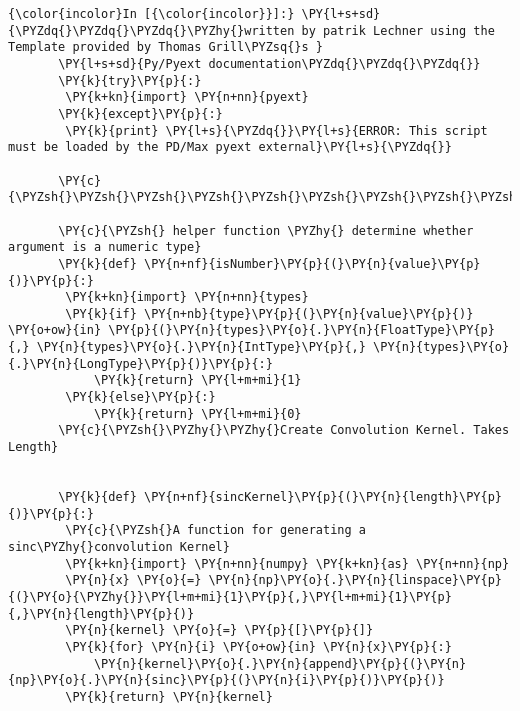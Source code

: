     
    \begin{Verbatim}[commandchars=\\\{\}]
{\color{incolor}In [{\color{incolor}}]:} \PY{l+s+sd}{\PYZdq{}\PYZdq{}\PYZdq{}\PYZhy{}written by patrik Lechner using the Template provided by Thomas Grill\PYZsq{}s }
       \PY{l+s+sd}{Py/Pyext documentation\PYZdq{}\PYZdq{}\PYZdq{}}
       \PY{k}{try}\PY{p}{:}
       	\PY{k+kn}{import} \PY{n+nn}{pyext}
       \PY{k}{except}\PY{p}{:}
       	\PY{k}{print} \PY{l+s}{\PYZdq{}}\PY{l+s}{ERROR: This script must be loaded by the PD/Max pyext external}\PY{l+s}{\PYZdq{}}
       
       \PY{c}{\PYZsh{}\PYZsh{}\PYZsh{}\PYZsh{}\PYZsh{}\PYZsh{}\PYZsh{}\PYZsh{}\PYZsh{}\PYZsh{}\PYZsh{}\PYZsh{}\PYZsh{}\PYZsh{}\PYZsh{}\PYZsh{}\PYZsh{}\PYZsh{}\PYZsh{}\PYZsh{}\PYZsh{}\PYZsh{}\PYZsh{}\PYZsh{}\PYZsh{}\PYZsh{}\PYZsh{}\PYZsh{}\PYZsh{}\PYZsh{}\PYZsh{}\PYZsh{}\PYZsh{}\PYZsh{}\PYZsh{}\PYZsh{}\PYZsh{}\PYZsh{}\PYZsh{}\PYZsh{}\PYZsh{}\PYZsh{}\PYZsh{}\PYZsh{}\PYZsh{}\PYZsh{}\PYZsh{}\PYZsh{}\PYZsh{}\PYZsh{}\PYZsh{}\PYZsh{}\PYZsh{}\PYZsh{}\PYZsh{}\PYZsh{}\PYZsh{}\PYZsh{}\PYZsh{}\PYZsh{}\PYZsh{}\PYZsh{}\PYZsh{}\PYZsh{}\PYZsh{}}
       
       \PY{c}{\PYZsh{} helper function \PYZhy{} determine whether argument is a numeric type}
       \PY{k}{def} \PY{n+nf}{isNumber}\PY{p}{(}\PY{n}{value}\PY{p}{)}\PY{p}{:}
       	\PY{k+kn}{import} \PY{n+nn}{types}
       	\PY{k}{if} \PY{n+nb}{type}\PY{p}{(}\PY{n}{value}\PY{p}{)} \PY{o+ow}{in} \PY{p}{(}\PY{n}{types}\PY{o}{.}\PY{n}{FloatType}\PY{p}{,} \PY{n}{types}\PY{o}{.}\PY{n}{IntType}\PY{p}{,} \PY{n}{types}\PY{o}{.}\PY{n}{LongType}\PY{p}{)}\PY{p}{:}
       		\PY{k}{return} \PY{l+m+mi}{1}
       	\PY{k}{else}\PY{p}{:}
       		\PY{k}{return} \PY{l+m+mi}{0}
       \PY{c}{\PYZsh{}\PYZhy{}\PYZhy{}Create Convolution Kernel. Takes Length}
       
       
       \PY{k}{def} \PY{n+nf}{sincKernel}\PY{p}{(}\PY{n}{length}\PY{p}{)}\PY{p}{:}
       	\PY{c}{\PYZsh{}A function for generating a sinc\PYZhy{}convolution Kernel}
       	\PY{k+kn}{import} \PY{n+nn}{numpy} \PY{k+kn}{as} \PY{n+nn}{np}
       	\PY{n}{x} \PY{o}{=} \PY{n}{np}\PY{o}{.}\PY{n}{linspace}\PY{p}{(}\PY{o}{\PYZhy{}}\PY{l+m+mi}{1}\PY{p}{,}\PY{l+m+mi}{1}\PY{p}{,}\PY{n}{length}\PY{p}{)}
       	\PY{n}{kernel} \PY{o}{=} \PY{p}{[}\PY{p}{]}
       	\PY{k}{for} \PY{n}{i} \PY{o+ow}{in} \PY{n}{x}\PY{p}{:}
       		\PY{n}{kernel}\PY{o}{.}\PY{n}{append}\PY{p}{(}\PY{n}{np}\PY{o}{.}\PY{n}{sinc}\PY{p}{(}\PY{n}{i}\PY{p}{)}\PY{p}{)}
       	\PY{k}{return} \PY{n}{kernel}
       

\end{Verbatim}
